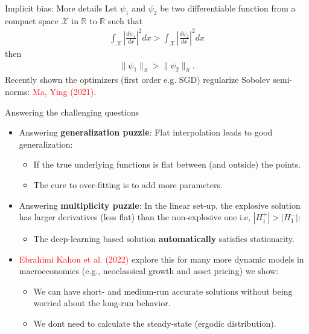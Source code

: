\documentclass[aspectratio=169,10pt]{beamer}
\newcommand{\emphcolor}[1]{\textbf{\textcolor{emphcolorval}{#1}}}
\begin{document}
\begin{frame}{Implicit bias: More details}
	Let $\psi_1$ and $\psi_2$ be two differentiable function from a compact space $\mathcal{X}$ in $\mathbb{R}$ to $\mathbb{R}$ such that
	\begin{align*}
		\int_\mathcal{X}\left|\frac{d \psi_1}{dx}\right|^2 dx >   \int_\mathcal{X}\left|\frac{d \psi_2}{dx}\right|^2 dx
	\end{align*}
	then
	\begin{align*}
		\|\psi_1\|_S > \|\psi_2\|_S.
	\end{align*}
	Recently shown the optimizers (first order e.g. SGD) regularize Sobolev semi-norms: \textcolor{red}{Ma, Ying (2021)}.
\end{frame}


\begin{frame}{Answering the challenging questions}
	\begin{itemize}
		\item Answering \emphcolor{generalization puzzle}: Flat  interpolation leads to good generalization:\vspace{0.1in}
		\begin{itemize}
			\item If the true underlying functions is flat between (and outside) the points.\vspace{0.1in}
			\item The cure to over-fitting is to add more parameters.\vspace{0.1in}
		\end{itemize}
	 \item Answering \emphcolor{multiplicity puzzle}: In the linear set-up, the explosive solution has larger derivatives (less flat) than the non-explosive one i.e, $|H_1^+| > |H_1^-|$:\vspace{0.1in}
	 \begin{itemize}
	 	\item The deep-learning based solution \emphcolor{automatically} satisfies stationarity. \vspace{0.1in}
	 \end{itemize}
	\item \textcolor{red}{Ebrahimi Kahou et al. (2022)} explore this for many more dynamic models in macroeconomics (e.g., neoclassical growth and asset pricing) we show: \vspace{0.1in}
	\begin{itemize}
		\item We can have short- and medium-run accurate solutions without being worried about the long-run behavior.\vspace{0.1in}
		\item  We dont need to calculate the steady-state (ergodic distribution).
	\end{itemize} 	
	\end{itemize}
	
\end{frame}				
\end{document}
